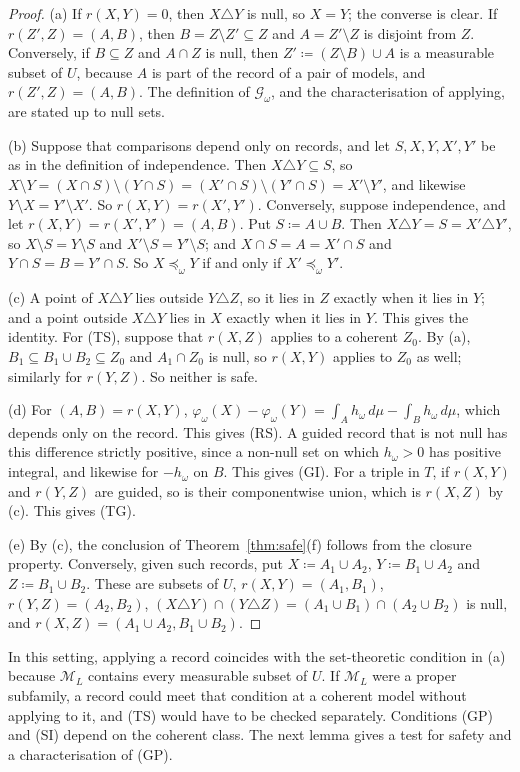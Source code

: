 \documentclass[11pt]{article}
\theoremstyle{definition}
\theoremstyle{remark}
\newcommand{\M}{\mathcal M}
\newcommand{\G}{\mathcal G}
\begin{document}
\begin{proof}
(a) If $r(X,Y)=0$, then $X\triangle Y$ is null, so $X=Y$; the converse is clear. If $r(Z',Z)=(A,B)$, then $B=Z\setminus Z'\subseteq Z$ and $A=Z'\setminus Z$ is disjoint from $Z$. Conversely, if $B\subseteq Z$ and $A\cap Z$ is null, then $Z'\coloneqq(Z\setminus B)\cup A$ is a measurable subset of $U$, because $A$ is part of the record of a pair of models, and $r(Z',Z)=(A,B)$. The definition of $\G_\omega$, and the characterisation of applying, are stated up to null sets.

(b) Suppose that comparisons depend only on records, and let $S,X,Y,X',Y'$ be as in the definition of independence. Then $X\triangle Y\subseteq S$, so $X\setminus Y=(X\cap S)\setminus(Y\cap S)=(X'\cap S)\setminus(Y'\cap S)=X'\setminus Y'$, and likewise $Y\setminus X=Y'\setminus X'$. So $r(X,Y)=r(X',Y')$. Conversely, suppose independence, and let $r(X,Y)=r(X',Y')=(A,B)$. Put $S\coloneqq A\cup B$. Then $X\triangle Y=S=X'\triangle Y'$, so $X\setminus S=Y\setminus S$ and $X'\setminus S=Y'\setminus S$; and $X\cap S=A=X'\cap S$ and $Y\cap S=B=Y'\cap S$. So $X\preceq_\omega Y$ if and only if $X'\preceq_\omega Y'$.

(c) A point of $X\triangle Y$ lies outside $Y\triangle Z$, so it lies in $Z$ exactly when it lies in $Y$; and a point outside $X\triangle Y$ lies in $X$ exactly when it lies in $Y$. This gives the identity. For (TS), suppose that $r(X,Z)$ applies to a coherent $Z_0$. By (a), $B_1\subseteq B_1\cup B_2\subseteq Z_0$ and $A_1\cap Z_0$ is null, so $r(X,Y)$ applies to $Z_0$ as well; similarly for $r(Y,Z)$. So neither is safe.

(d) For $(A,B)=r(X,Y)$, $\varphi_\omega(X)-\varphi_\omega(Y)=\int_Ah_\omega\,d\mu-\int_Bh_\omega\,d\mu$, which depends only on the record. This gives (RS). A guided record that is not null has this difference strictly positive, since a non-null set on which $h_\omega>0$ has positive integral, and likewise for $-h_\omega$ on $B$. This gives (GI). For a triple in $T$, if $r(X,Y)$ and $r(Y,Z)$ are guided, so is their componentwise union, which is $r(X,Z)$ by (c). This gives (TG).

(e) By (c), the conclusion of Theorem~\ref{thm:safe}(f) follows from the closure property. Conversely, given such records, put $X\coloneqq A_1\cup A_2$, $Y\coloneqq B_1\cup A_2$ and $Z\coloneqq B_1\cup B_2$. These are subsets of $U$, $r(X,Y)=(A_1,B_1)$, $r(Y,Z)=(A_2,B_2)$, $(X\triangle Y)\cap(Y\triangle Z)=(A_1\cup B_1)\cap(A_2\cup B_2)$ is null, and $r(X,Z)=(A_1\cup A_2,B_1\cup B_2)$.
\end{proof}
In this setting, applying a record coincides with the set-theoretic condition in (a) because $\M_L$ contains every measurable subset of $U$. If $\M_L$ were a proper subfamily, a record could meet that condition at a coherent model without applying to it, and (TS) would have to be checked separately. Conditions (GP) and (SI) depend on the coherent class. The next lemma gives a test for safety and a characterisation of (GP).
\end{document}
